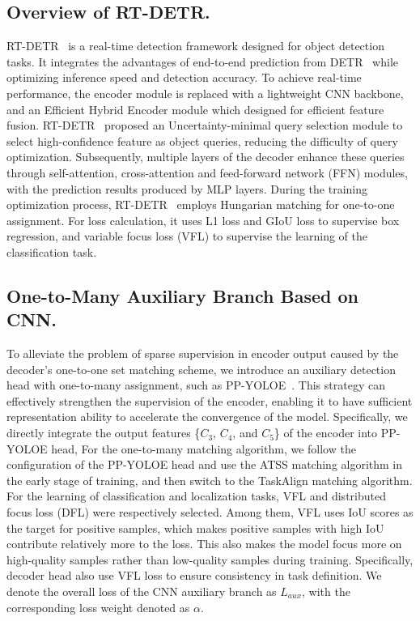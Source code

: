 \documentclass[10pt,twocolumn,letterpaper]{article}
\begin{document}
\subsection{Overview of RT-DETR.}
RT-DETR~\cite{zhao2024rt-detr} is a real-time detection framework designed for object detection tasks. It integrates the advantages of end-to-end prediction from DETR~\cite{2020detr} while optimizing inference speed and detection accuracy. To achieve real-time performance, the encoder module is replaced with a lightweight CNN backbone, and an Efficient Hybrid Encoder module which designed for efficient feature fusion. RT-DETR~\cite{zhao2024rt-detr} proposed an Uncertainty-minimal query selection module to select high-confidence feature as object queries, reducing the difficulty of query optimization. Subsequently, multiple layers of the decoder enhance these queries through self-attention, cross-attention and feed-forward network (FFN) modules, with the prediction results produced by MLP layers. During the training optimization process, RT-DETR~\cite{zhao2024rt-detr} employs Hungarian matching for one-to-one assignment. For loss calculation, it uses L1 loss and GIoU loss to supervise box regression, and variable focus loss (VFL) to supervise the learning of the classification task.

\subsection{One-to-Many Auxiliary Branch Based on CNN.}
To alleviate the problem of sparse supervision in encoder output caused by the decoder's one-to-one set matching scheme, we introduce an auxiliary detection head with one-to-many assignment, such as PP-YOLOE~\cite{xu2022ppyoloe}. This strategy can effectively strengthen the supervision of the encoder, enabling it to have sufficient representation ability to accelerate the convergence of the model. Specifically, we directly integrate the output features \{$C_{3}$, $C_{4}$, and $C_{5}$\} of the encoder into PP-YOLOE head, For the one-to-many matching algorithm, we follow the configuration of the PP-YOLOE head and use the ATSS matching algorithm in the early stage of training, and then switch to the TaskAlign matching algorithm. For the learning of classification and localization tasks, VFL and distributed focus loss (DFL) were respectively selected. Among them, VFL uses IoU scores as the target for positive samples, which makes positive samples with high IoU contribute relatively more to the loss. This also makes the model focus more on high-quality samples rather than low-quality samples during training. Specifically, decoder head also use VFL loss to ensure consistency in task definition. We denote the overall loss of the CNN auxiliary branch as $L_{aux}$, with the corresponding loss weight denoted as $\alpha$.
\end{document}
